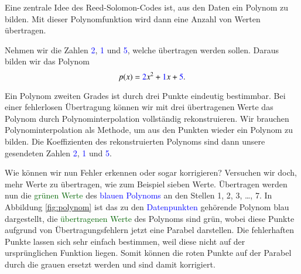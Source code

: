 Eine zentrale Idee des Reed-Solomon-Codes ist, aus den Daten ein Polynom zu bilden. 
Mit dieser Polynomfunktion wird dann eine Anzahl von Werten übertragen.
\begin{beispiel} Nehmen wir die Zahlen \textcolor{blue}{2}, \textcolor{blue}{1} und \textcolor{blue}{5}, welche übertragen werden sollen. Daraus bilden wir das Polynom
\begin{equation}
p(x)
=
\textcolor{blue}{2}x^2 + \textcolor{blue}{1}x + \textcolor{blue}{5}.
\label{reedsolomon:equation1}
\end{equation}

Ein Polynom zweiten Grades ist durch drei Punkte eindeutig bestimmbar. 
Bei einer fehlerlosen Übertragung können wir mit drei übertragenen Werte
das Polynom durch Polynominterpolation vollständig rekonstruieren.
Wir brauchen Polynominterpolation als Methode, um aus den Punkten wieder ein Polynom zu bilden.
Die Koeffizienten des rekonstruierten Polynoms sind dann unsere gesendeten Zahlen \textcolor{blue}{2}, \textcolor{blue}{1} und \textcolor{blue}{5}.

Wie können wir nun Fehler erkennen oder sogar korrigieren?
Versuchen wir doch, mehr Werte zu übertragen, wie zum Beispiel sieben Werte. 
Übertragen werden nun die \textcolor{darkgreen}{grünen Werte} 
    des \textcolor{blue}{blauen Polynoms} an den Stellen 1, 2, 3, \dots , 7.
In Abbildung \ref{fig:polynom} ist das zu den \textcolor{blue}{Datenpunkten} gehörende Polynom blau dargestellt,
die \textcolor{darkgreen}{übertragenen Werte} des Polynoms sind grün, wobei diese Punkte aufgrund von Übertragungsfehlern jetzt eine Parabel darstellen. 
Die fehlerhaften Punkte lassen sich sehr einfach bestimmen, weil diese nicht auf der ursprünglichen Funktion liegen. 
Somit können die roten Punkte auf der Parabel durch die grauen ersetzt werden und sind damit korrigiert. 


\end{beispiel}
